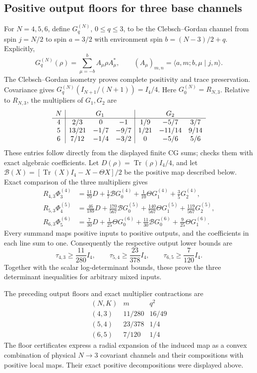 \documentclass[11pt,a4paper]{article}
\newcommand{\Tr}{\operatorname{Tr}}
\begin{document}
\subsection{Positive output floors for three base channels}
For $N=4,5,6$, define $G_q^{(N)}$, $0\le q\le3$, to be the
Clebsch--Gordan channel from spin $j=N/2$ to spin $a=3/2$ with
environment spin $b=(N-3)/2+q$. Explicitly,
\[
 G_q^{(N)}(\rho)=\sum_{\mu=-b}^b A_\mu\rho A_\mu^*,\qquad
 (A_\mu)_{m,n}=\langle a,m;b,\mu\mid j,n\rangle.
\]
The Clebsch--Gordan isometry proves complete positivity and trace
preservation. Covariance gives $G_q^{(N)}(I_{N+1}/(N+1))=I_4/4$.
Here $G_0^{(N)}=R_{N,3}$. Relative to $R_{N,3}$, the multipliers of
$G_1,G_2$ are
\[
\begin{array}{c|ccc|ccc}
 N&\multicolumn{3}{c|}{G_1}&\multicolumn{3}{c}{G_2}\\\hline
4&2/3&0&-1&1/9&-5/7&3/7\\
5&13/21&-1/7&-9/7&1/21&-11/14&9/14\\
6&7/12&-1/4&-3/2&0&-5/6&5/6
\end{array}
\]
These entries follow directly from the displayed finite CG sums;
 checks them with exact algebraic
coefficients. Let $D(\rho)=\Tr(\rho)I_4/4$, and let
$\mathcal B(X)=[\Tr(X)I_4-X-\Theta X]/2$ be the positive map
described below. Exact comparison of the three multipliers gives
\begin{align}
 R_{4,3}\Phi^{(4)}_3
 &=\frac{11}{70}D+\frac17\mathcal B G_0^{(4)}
             +\frac1{10}\Theta G_1^{(4)}+\frac35G_2^{(4)},\\
 R_{5,3}\Phi^{(5)}_4
 &=\frac{46}{189}D+\frac{170}{567}\mathcal B G_0^{(5)}
             +\frac{140}{567}\Theta G_1^{(5)}+\frac{119}{567}G_2^{(5)},\\
 R_{6,3}\Phi^{(6)}_5
 &=\frac7{30}D+\frac1{25}\Theta G_0^{(6)}
             +\frac{11}{30}\mathcal B G_0^{(6)}+\frac9{25}\Theta G_1^{(6)}.
\end{align}
Every summand maps positive inputs to positive outputs, and the
coefficients in each line sum to one. Consequently the respective
output lower bounds are
\[
 \tau_{4,3}\ge\frac{11}{280}I_4,\qquad
 \tau_{5,4}\ge\frac{23}{378}I_4,\qquad
 \tau_{6,5}\ge\frac7{120}I_4.
\]
Together with the scalar log-determinant bounds, these prove the
three determinant inequalities for arbitrary mixed inputs.


The preceding output floors and exact multiplier
contractions are
\[
\begin{array}{c|c|c}
 (N,K)&m& q^2\\\hline
 (4,3)&11/280&16/49\\
 (5,4)&23/378&1/4\\
 (6,5)&7/120&1/4
\end{array}
\]
The floor certificates express a radial expansion of the induced
map as a convex combination of physical $N\to3$ covariant channels
and their compositions with positive local maps. Their exact positive decompositions were displayed above.
\end{document}
